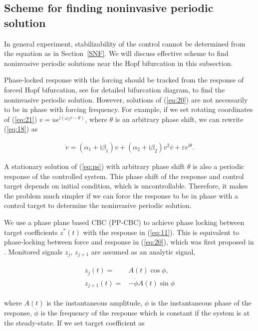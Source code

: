 \documentclass[openacc]{rsproca_new}%
\def\epsilon{\varepsilon}
\newcommand{\Eref}[1]{(\ref{#1})}
\newcommand{\Sref}[1]{Section~\ref{#1}}
\begin{document}
\subsection{Scheme for finding noninvasive periodic solution}\label{FNP}

In general experiment, stabilizability of the control cannot be determined from the equation as in \Sref{SNF}. We will discuss effective scheme to find noninvasive periodic solutions near the Hopf bifurcation in this subsection.

Phase-locked response with the forcing should be tracked from the response of forced Hopf bifurcation, see \cite{zhang2011periodically,wiser2015bifurcations} for detailed bifurcation diagram, to find the noninvasive periodic solution. However, solutions of \Eref{eq:20} are not necessarily to be in phase with forcing frequency. For example, if we set rotating coordinates of \Eref{eq:21} $v=ue^{\textrm{i}(\omega_2 \tau-\theta)}$, where $\theta$ is an arbitrary phase shift, we can rewrite \Eref{eq:18}
as

\begin{align}\label{eq:ps}
\dot v=(\alpha_1+\textrm{i}\beta_1)v+(\alpha_2+\textrm{i}\beta_2)v^2 \bar v+\epsilon e^{\textrm{i}\theta}.
\end{align}

\noindent A stationary solution of \Eref{eq:ps} with arbitrary phase shift $\theta$ is also a periodic response of the controlled system. This phase shift of the response and control target depends on initial condition, which is uncontrollable. Therefore, it makes the problem much simpler if we can force the response to be in phase with a control target to determine the noninvasive periodic solution.

We use a phase plane based CBC (PP-CBC) to achieve phase locking between target coefficients $z^*(t)$ with the response in \Eref{eq:11}. This is equivalent to phase-locking between force and response in \Eref{eq:20}, which was first proposed in \cite{irene}. Monitored signals $z_j$, $z_{j+1}$  are assumed as an analytic signal,

\begin{align}\label{eq:25}
\begin{split}
z_{j}(t)=&A(t)\cos{\phi},\\
z_{j+1}(t)=&-\dot\phi A(t)\sin{\phi}
\end{split}
\end{align}

\noindent where $A(t)$ is the instantaneous amplitude, $\phi$ is the instantaneous phase of the response, $\dot\phi$ is the frequency of the response which is constant if the system is at the steady-state. If we set target coefficient as
\end{document}

